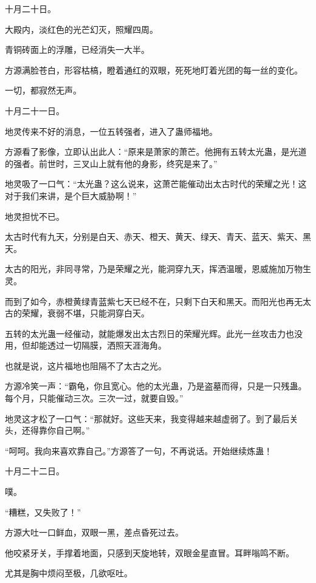 
\begin{this_body}

十月二十日。

大殿内，淡红色的光芒幻灭，照耀四周。

青铜砖面上的浮雕，已经消失一大半。

方源满脸苍白，形容枯槁，瞪着通红的双眼，死死地盯着光团的每一丝的变化。

一切，都寂然无声。

十月二十一日。

地灵传来不好的消息，一位五转强者，进入了蛊师福地。

方源看了影像，立即认出此人：“原来是萧家的萧芒。他拥有五转太光蛊，是光道的强者。前世时，三叉山上就有他的身影，终究是来了。”

地灵吸了一口气：“太光蛊？这么说来，这萧芒能催动出太古时代的荣耀之光！这对于我们来讲，是个巨大威胁啊！”

地灵担忧不已。

太古时代有九天，分别是白天、赤天、橙天、黄天、绿天、青天、蓝天、紫天、黑天。

太古的阳光，非同寻常，乃是荣耀之光，能洞穿九天，挥洒温暖，恩威施加万物生灵。

而到了如今，赤橙黄绿青蓝紫七天已经不在，只剩下白天和黑天。而阳光也再无太古的荣耀，衰弱不堪，只能洞穿白天。

五转的太光蛊一经催动，就能爆发出太古烈日的荣耀光辉。此光一丝攻击力也没用，但却能透过一切隔膜，洒照天涯海角。

也就是说，这片福地也阻隔不了太古之光。

方源冷笑一声：“霸龟，你且宽心。他的太光蛊，乃是盗墓而得，只是一只残蛊。每个月，只能催动三次。三次一过，就要自毁。”

地灵这才松了一口气：“那就好。这些天来，我变得越来越虚弱了。到了最后关头，还得靠你自己啊。”

“呵呵。我向来喜欢靠自己。”方源答了一句，不再说话。开始继续炼蛊！

十月二十二日。

噗。

“糟糕，又失败了！”

方源大吐一口鲜血，双眼一黑，差点昏死过去。

他咬紧牙关，手撑着地面，只感到天旋地转，双眼金星直冒。耳畔嗡鸣不断。

尤其是胸中烦闷至极，几欲呕吐。


\end{this_body}
